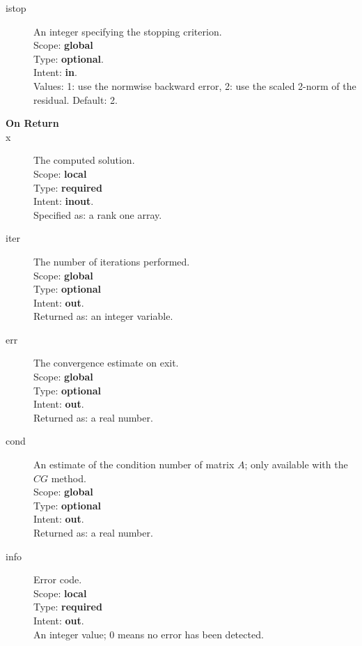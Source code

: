 \begin{description}
\item[istop]  An integer specifying the stopping criterion.\\
Scope: {\bf global} \\
Type: {\bf optional}.\\
Intent: {\bf in}.\\
Values: 1: use the normwise backward error, 2: use the scaled 2-norm
of the residual. Default: 2. 
\item[\bf On Return] 
\item[x] The computed solution. \\
Scope: {\bf local} \\
Type: {\bf required}\\
Intent: {\bf inout}.\\
Specified as: a rank one array.
\item[iter]  The number of iterations performed.\\
Scope: {\bf global} \\
Type: {\bf optional}\\
Intent: {\bf out}.\\
Returned  as: an integer variable.
\item[err]  The convergence estimate on exit.\\
Scope: {\bf global} \\
Type: {\bf optional}\\
Intent: {\bf out}.\\
Returned  as: a real number.
\item[cond]  An estimate of the condition number of matrix $A$; only
  available with the $CG$ method.\\
Scope: {\bf global} \\
Type: {\bf optional}\\
Intent: {\bf out}.\\
Returned  as: a real number.
\item[info] Error code.\\
Scope: {\bf local} \\
Type: {\bf required} \\
Intent: {\bf out}.\\
An integer value; 0 means no error has been detected. 
\end{description}


